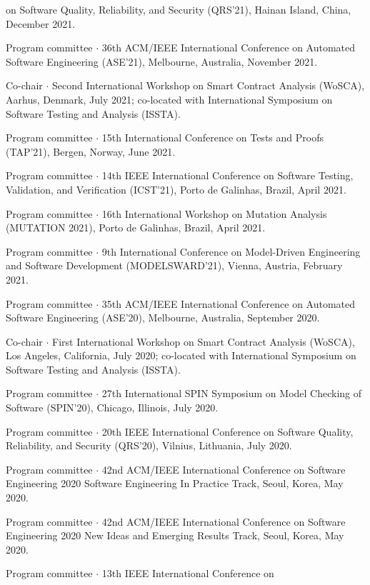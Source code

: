 \documentclass[ComputerScience]{vita}
\begin{document}
\begin{vita}
\begin{Panel and Committee Service}
    on Software Quality, Reliability, and Security (QRS'21), Hainan 
    Island, China, December 2021.   
\item Program committee $\cdot$ 36th ACM/IEEE International Conference 
  on Automated Software Engineering (ASE'21), Melbourne, Australia, 
  November 2021.
\item Co-chair $\cdot$ Second International Workshop on Smart Contract 
  Analysis (WoSCA), Aarhus, Denmark, July 2021; co-located with 
  International Symposium on Software Testing and Analysis (ISSTA).
\item Program committee $\cdot$ 15th International Conference on Tests
  and Proofs (TAP'21), Bergen, Norway, June 2021.
\item Program committee $\cdot$ 14th IEEE International Conference on 
  Software Testing, Validation, and Verification (ICST'21), Porto de 
  Galinhas, Brazil, April 2021.
  \item Program committee $\cdot$ 16th International Workshop on
    Mutation Analysis (MUTATION 2021), Porto de 
  Galinhas, Brazil, April 2021.
\item Program committee $\cdot$ 9th International Conference on 
  Model-Driven Engineering and Software Development (MODELSWARD'21), Vienna, Austria, 
  February 2021.   
\item Program committee $\cdot$ 35th ACM/IEEE International Conference 
  on Automated Software Engineering (ASE'20), Melbourne, Australia, 
  September 2020.
\item Co-chair $\cdot$ First International Workshop on Smart Contract 
  Analysis (WoSCA), Los Angeles, California, July 2020; co-located with 
  International Symposium on Software Testing and Analysis (ISSTA).
\item Program committee $\cdot$ 27th International SPIN Symposium on
  Model Checking of Software (SPIN'20), Chicago, Illinois,
  July 2020.
  \item Program committee $\cdot$ 20th IEEE International Conference 
    on Software Quality, Reliability, and Security (QRS'20), Vilnius, 
    Lithuania, July 2020. 
  \item Program committee $\cdot$ 42nd ACM/IEEE International Conference on 
  Software Engineering 2020 Software Engineering In Practice Track, 
  Seoul, Korea, May 2020.
\item Program committee $\cdot$ 42nd ACM/IEEE International Conference on 
  Software Engineering 2020 New Ideas and Emerging Results Track, 
  Seoul, Korea, May 2020.
\item Program committee $\cdot$ 13th IEEE International Conference on

\end{Panel and Committee Service}
\end{vita}
\end{document}
